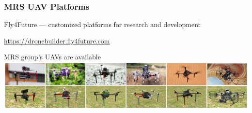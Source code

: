\documentclass[aspectratio=169]{beamer}
\begin{document}
\begin{frame}
\frametitle{MRS UAV Platforms}

\begin{block}{Fly4Future --- customized platforms for research and development}
  \begin{center}
    \Large\url{https://dronebuilder.fly4future.com}
  \end{center}
\end{block}

\begin{block}{MRS group's UAVs are available}
  \includegraphics[width=1.0\textwidth]{./fig/uavs.png}
\end{block}

\end{frame}
\end{document}
